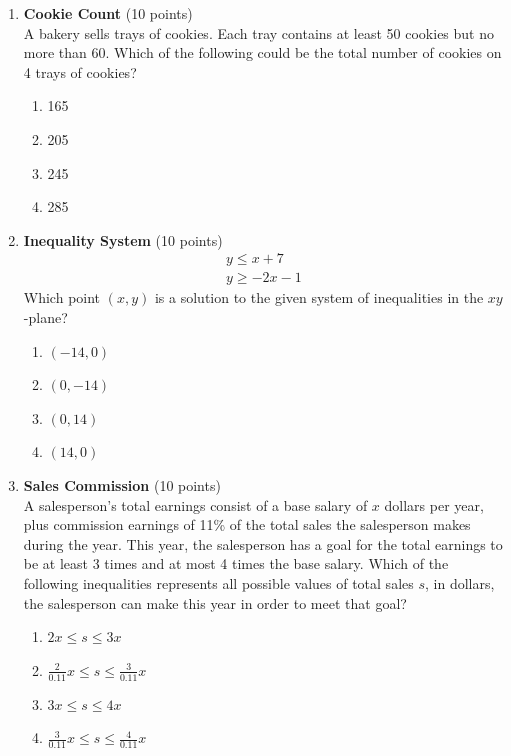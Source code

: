 \begin{enumerate}
  \item \textbf{Cookie Count} (10 points)\\
  A bakery sells trays of cookies. Each tray contains at least 50 cookies but no more than 60. Which of the following could be the total number of cookies on 4 trays of cookies?\\
  \begin{enumerate}[label=(\Alph*)]
    \item 165
    \item 205
    \item 245
    \item 285
  \end{enumerate}
  \begin{subanswer}
  \end{subanswer}

  \newpage

  \item \textbf{Inequality System} (10 points)\\
  \[\begin{gathered}
  y \leq x+7 \\
  y \geq-2x-1
  \end{gathered}\]
  Which point $(x,y)$ is a solution to the given system of inequalities in the $xy$-plane?\\
  \begin{enumerate}[label=(\Alph*)]
    \item $(-14,0)$
    \item $(0,-14)$
    \item $(0,14)$
    \item $(14,0)$
  \end{enumerate}
  \begin{subanswer}
  \end{subanswer}

  \item \textbf{Sales Commission} (10 points)\\
  A salesperson's total earnings consist of a base salary of $x$ dollars per year, plus commission earnings of 11\% of the total sales the salesperson makes during the year. This year, the salesperson has a goal for the total earnings to be at least 3 times and at most 4 times the base salary. Which of the following inequalities represents all possible values of total sales $s$, in dollars, the salesperson can make this year in order to meet that goal?\\
  \begin{enumerate}[label=(\Alph*)]
    \item $2x \leq s \leq 3x$
    \item $\frac{2}{0.11}x \leq s \leq \frac{3}{0.11}x$
    \item $3x \leq s \leq 4x$
    \item $\frac{3}{0.11}x \leq s \leq \frac{4}{0.11}x$
  \end{enumerate}
  \begin{subanswer}
  \end{subanswer}


\end{enumerate}
